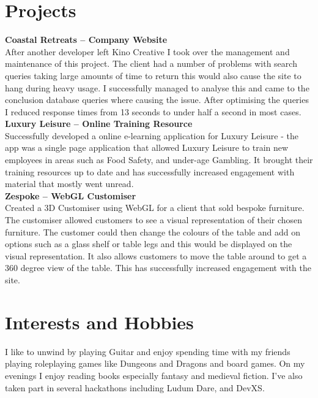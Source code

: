 \documentclass[10pt]{article}
\begin{document}
\section*{Projects}
{\bf Coastal Retreats -- Company Website}\\
After another developer left Kino Creative I took over the management and maintenance of this project. The client had a number of problems with search queries taking large amounts of time to return this would also cause the site to hang during heavy usage. I successfully managed to analyse this and came to the conclusion database queries where causing the issue. After optimising the queries I reduced response times from 13 seconds to under half a second in most cases.\\
{\bf Luxury Leisure -- Online Training Resource}\\
Successfully developed a online e-learning application for Luxury Leisure - the app was a single page application that allowed Luxury Leisure to train new employees in areas such as Food Safety, and under-age Gambling. It brought their training resources up to date and has successfully increased engagement with material that mostly went unread.\\
{\bf Zespoke -- WebGL Customiser}\\
Created a 3D Customiser using WebGL for a client that sold bespoke furniture. The customiser allowed customers to see a visual representation of their chosen furniture. The customer could then change the colours of the table and add on options such as a glass shelf or table legs and this would be displayed on the visual representation. It also allows customers to move the table around to get a 360 degree view of the table. This has successfully increased engagement with the site.\\
\section*{Interests and Hobbies}
I like to unwind by playing Guitar and enjoy spending time with my friends playing roleplaying games like Dungeons and Dragons and board games. On my evenings I enjoy reading books especially fantasy and medieval fiction. I've also taken part in several hackathons including Ludum Dare, and DevXS.
\end{document}
